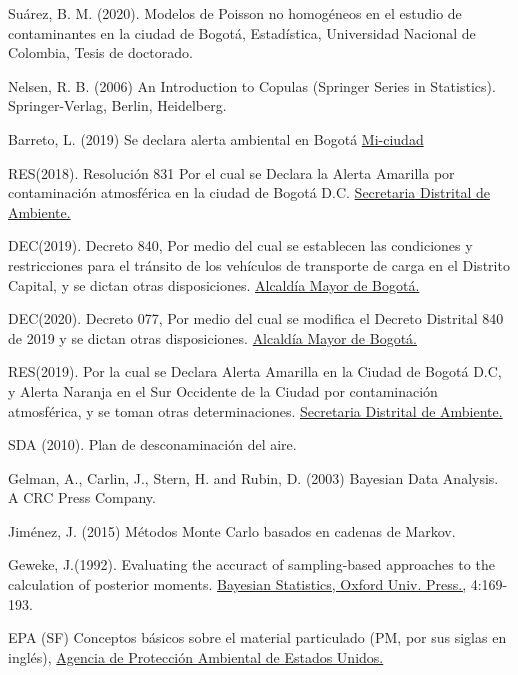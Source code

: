 
\begin{thebibliography}{X}

 Suárez, B. M. (2020). Modelos de Poisson no homogéneos en el estudio de contaminantes en la ciudad de Bogotá, Estadística, Universidad Nacional de Colombia, Tesis de doctorado.

 Nelsen, R. B. (2006) An Introduction to Copulas (Springer Series in Statistics). Springer-Verlag, Berlin, Heidelberg.  

 Barreto, L. (2019) Se declara alerta ambiental en Bogotá \underline{Mi-ciudad}


 RES(2018). Resolución 831 Por el cual se Declara la Alerta Amarilla por contaminación atmosférica en la ciudad de Bogotá D.C. \underline{Secretaria Distrital de Ambiente.} 

 DEC(2019). Decreto 840, Por medio del cual se establecen las condiciones y restricciones para el tránsito de los vehículos de transporte de carga en el Distrito Capital, y se dictan otras disposiciones. \underline{Alcaldía Mayor de Bogotá.} 


 DEC(2020). Decreto 077, Por medio del cual se modifica el Decreto Distrital 840 de 2019 y se dictan otras disposiciones. \underline{Alcaldía Mayor de Bogotá.} 



 RES(2019). Por la cual se Declara Alerta Amarilla en la Ciudad de Bogotá D.C, y Alerta Naranja en el Sur Occidente de la Ciudad por contaminación atmosférica, y se toman otras determinaciones. \underline{Secretaria Distrital de Ambiente.} 

 SDA (2010). Plan de desconaminación del aire. 

 Gelman, A., Carlin, J., Stern, H. and Rubin, D. (2003) Bayesian Data Analysis. A CRC Press Company. 


 Jiménez, J. (2015) Métodos Monte Carlo basados en cadenas de Markov. 


 Geweke, J.(1992). Evaluating the accuract of sampling-based approaches to the calculation of posterior moments. \underline{Bayesian Statistics, Oxford Univ. Press.,} 4:169-193.

 EPA (SF) Conceptos básicos sobre el material particulado (PM, por sus siglas en inglés), \underline{ Agencia de Protección Ambiental de Estados Unidos.}



\end{thebibliography}
